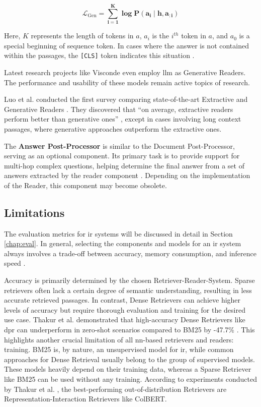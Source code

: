 \begin{equation}
    \mathbf{\mathcal{L}_{\mathrm{Gen}}=\sum_{i=1}^K \log \mathbf{P}\left(a_i \mid \mathbf{h}, a_{: i}\right)}
\end{equation}

Here, $K$ represents the length of tokens in $a$, $a_i$ is the $i^{th}$ token in $a$, and $a_0$ is a special beginning of sequence token. In cases where the answer is not contained within the passages, the \verb|[CLS]| token indicates this situation \cite{luo_choose_2022,zhu_retrieving_2021}.

Latest research projects like Visconde \cite{pereira_visconde_2022} even employ \gls{llm} as Generative Readers. The performance and usability of these models remain active topics of research.

Luo et al. conducted the first survey comparing state-of-the-art Extractive and Generative Readers \cite{luo_choose_2022}. They discovered that \enquote{on average, extractive readers perform better than generative ones} \cite{luo_choose_2022}, except in cases involving long context passages, where generative approaches outperform the extractive ones.

The \textbf{Answer Post-Processor} is similar to the Document Post-Processor, serving as an optional component. Its primary task is to provide support for multi-hop complex questions, helping determine the final answer from a set of answers extracted by the reader component \cite{zhu_retrieving_2021}. Depending on the implementation of the Reader, this component may become obsolete.


\subsection{Limitations}
\label{subsec:qa_limitations}

The evaluation metrics for \gls{ir} systems will be discussed in detail in Section \ref{chap:eval}. In general, selecting the components and models for an \gls{ir} system always involves a trade-off between accuracy, memory consumption, and inference speed \cite{zhang_survey_2023}.

Accuracy is primarily determined by the chosen Retriever-Reader-System. Sparse retrievers often lack a certain degree of semantic understanding, resulting in less accurate retrieved passages. In contrast, Dense Retrievers can achieve higher levels of accuracy but require thorough evaluation and training for the desired use case. Thakur et al. demonstrated that high-accuracy Dense Retrievers like \gls{dpr} can underperform in zero-shot scenarios compared to BM25 by -47.7\% \cite{thakur_beir_2021}. This highlights another crucial limitation of all \gls{nn}-based retrievers and readers: training. BM25 is, by nature, an unsupervised model for \gls{ir}, while common approaches for Dense Retrieval usually belong to the group of supervised models. These models heavily depend on their training data, whereas a Sparse Retriever like BM25 can be used without any training. According to experiments conducted by Thakur et al. \cite{thakur_beir_2021}, the best-performing out-of-distribution Retrievers are Representation-Interaction Retrievers like ColBERT.

